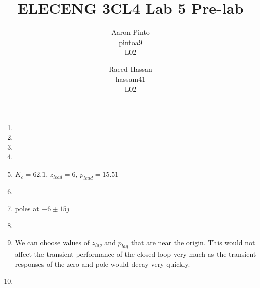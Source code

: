 \documentclass[12pt]{article}
\title{ELECENG 3CL4 Lab 5 Pre-lab}
\author{
    Aaron Pinto \\
    pintoa9 \\
    L02
    \and
    Raeed Hassan \\
    hassam41 \\
    L02
}
\begin{document}
\maketitle
\clearpage

\begin{enumerate}
	\item %

	\item %
	
	\item %
	
	\item %
	
	\item %
	$K_c = 62.1$, $z_{lead} = 6$, $p_{lead} = 15.51$
	
	\item %
	
	\item %
	poles at $-6 \pm 15j$

	\item %
	
	\item %
	We can choose values of $z_{lag}$ and $p_{lag}$ that are near the origin. This would not affect the transient performance of the closed loop very much as the transient responses of the zero and pole would decay very quickly. 
	
	\item %
	
\end{enumerate}
\end{document}
